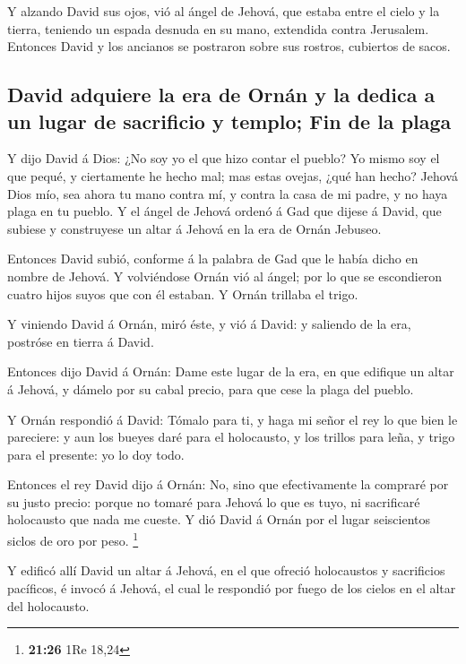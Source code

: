 Y alzando David sus ojos, vió al ángel de Jehová, que
estaba entre el cielo y la tierra, teniendo un espada desnuda en su
mano, extendida contra Jerusalem. Entonces David y los ancianos se
postraron sobre sus rostros, cubiertos de sacos.

\hypertarget{david-adquiere-la-era-de-ornuxe1n-y-la-dedica-a-un-lugar-de-sacrificio-y-templo-fin-de-la-plaga}{%
\subsection{David adquiere la era de Ornán y la dedica a un lugar de
sacrificio y templo; Fin de la
plaga}\label{david-adquiere-la-era-de-ornuxe1n-y-la-dedica-a-un-lugar-de-sacrificio-y-templo-fin-de-la-plaga}}

 Y dijo David á Dios: ¿No soy yo el que hizo contar el
pueblo? Yo mismo soy el que pequé, y ciertamente he hecho mal; mas estas
ovejas, ¿qué han hecho? Jehová Dios mío, sea ahora tu mano contra mí, y
contra la casa de mi padre, y no haya plaga en tu pueblo. 
Y el ángel de Jehová ordenó á Gad que dijese á David, que subiese y
construyese un altar á Jehová en la era de Ornán Jebuseo.

 Entonces David subió, conforme á la palabra de Gad que le
había dicho en nombre de Jehová.  Y volviéndose Ornán vió
al ángel; por lo que se escondieron cuatro hijos suyos que con él
estaban. Y Ornán trillaba el trigo.

 Y viniendo David á Ornán, miró éste, y vió á David: y
saliendo de la era, postróse en tierra á David.

 Entonces dijo David á Ornán: Dame este lugar de la era, en
que edifique un altar á Jehová, y dámelo por su cabal precio, para que
cese la plaga del pueblo.

 Y Ornán respondió á David: Tómalo para ti, y haga mi señor
el rey lo que bien le pareciere: y aun los bueyes daré para el
holocausto, y los trillos para leña, y trigo para el presente: yo lo doy
todo.

 Entonces el rey David dijo á Ornán: No, sino que
efectivamente la compraré por su justo precio: porque no tomaré para
Jehová lo que es tuyo, ni sacrificaré holocausto que nada me cueste.
 Y dió David á Ornán por el lugar seiscientos siclos de oro
por peso. \footnote{\textbf{21:26} 1Re 18,24}

 Y edificó allí David un altar á Jehová, en el que ofreció
holocaustos y sacrificios pacíficos, é invocó á Jehová, el cual le
respondió por fuego de los cielos en el altar del holocausto.

